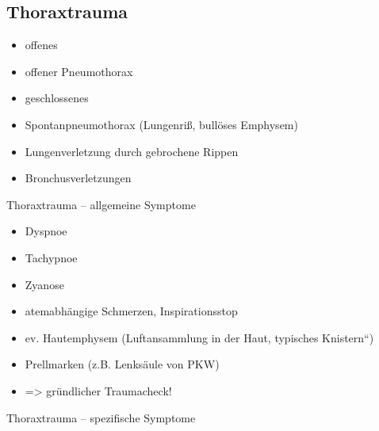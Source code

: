 \documentclass{article}
\begin{document}
\subsection{Thoraxtrauma}
\begin{itemize}
\item offenes

\end{itemize}
\begin{itemize}
\item offener Pneumothorax

\end{itemize}
\begin{itemize}
\item geschlossenes

\end{itemize}
\begin{itemize}
\item {}Spontanpneumothorax (Lungenri{\ss},
bull\"oses  Emphysem)

\item Lungenverletzung durch gebrochene Rippen 

\item Bronchusverletzungen

\end{itemize}
Thoraxtrauma -- allgemeine  Symptome

\begin{itemize}
\item Dyspnoe

\end{itemize}
\begin{itemize}
\item Tachypnoe

\item Zyanose

\end{itemize}
\begin{itemize}
\item atemabh\"angige  Schmerzen,  Inspirationsstop

\item ev. Hautemphysem (Luftansammlung in der Haut, typisches
{\quotedblbase}Knistern{\textquotedblleft})

\item Prellmarken (z.B. Lenks\"aule von PKW) 

\end{itemize}
\begin{itemize}
\item ={\textgreater} gr\"undlicher Traumacheck!

\end{itemize}
Thoraxtrauma -- spezifische  Symptome
\end{document}
